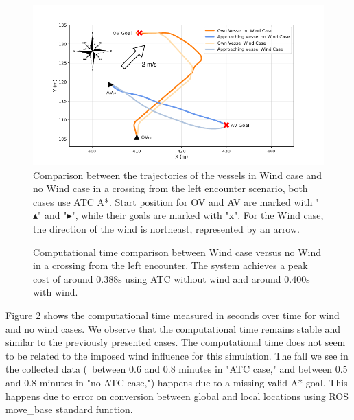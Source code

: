         \begin{figure}[H]
            \centering
            \includegraphics[width=\textwidth]{figs/Chap5/plot_cl_w_vs_wind.pdf}
            \caption{Comparison between the trajectories of the vessels in Wind case and no Wind case in a crossing from the left encounter scenario, both cases use \ac{ATC} A*. Start position for \ac{OV} and \ac{AV} are marked with "$\blacktriangle$" and "$\blacktriangleright$", while their goals are marked with "x". For the Wind case, the direction of the wind is northeast, represented by an arrow.}
            \label{fig:plot_cl_w_vs_wind}
        \end{figure}
        
        \begin{figure}[H]
            \centering
            
            \caption{Computational time comparison between Wind case versus no Wind in a crossing from the left encounter. The system achieves a peak cost of around 0.388s using \ac{ATC} without wind and around 0.400s with wind.}
            \label{fig:plot_cl_w_vs_wind_CT}
        \end{figure}
        
        Figure \ref{fig:plot_cl_w_vs_wind_CT} shows the computational time measured in seconds over time for wind and no wind cases. We observe that the computational time remains stable and similar to the previously presented cases. The computational time does not seem to be related to the imposed wind influence for this simulation. The fall we see in the collected data (\eg{}~between 0.6 and 0.8 minutes in "ATC case," and between 0.5 and 0.8 minutes in "no ATC case,") happens due to a missing valid A* goal. This happens due to error on conversion between global and local locations using ROS move\_base standard function.
        
